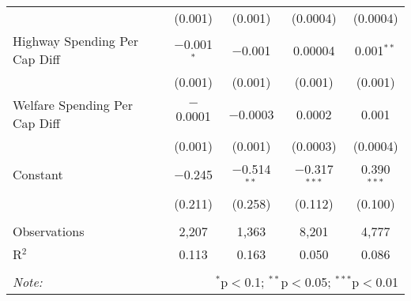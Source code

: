 \begin{table}[!htbp]
\begin{tabular}{@{\extracolsep{5pt}}lcccc}
  & (0.001) & (0.001) & (0.0004) & (0.0004) \\ 
  Highway Spending Per Cap Diff & $-$0.001$^{*}$ & $-$0.001 & 0.00004 & 0.001$^{**}$ \\ 
  & (0.001) & (0.001) & (0.001) & (0.001) \\ 
  Welfare Spending Per Cap Diff & $-$0.0001 & $-$0.0003 & 0.0002 & 0.001 \\ 
  & (0.001) & (0.001) & (0.0003) & (0.0004) \\ 
  Constant & $-$0.245 & $-$0.514$^{**}$ & $-$0.317$^{***}$ & 0.390$^{***}$ \\ 
  & (0.211) & (0.258) & (0.112) & (0.100) \\ 
 \hline \\[-1.8ex] 
Observations & 2,207 & 1,363 & 8,201 & 4,777 \\ 
R$^{2}$ & 0.113 & 0.163 & 0.050 & 0.086 \\ 
\hline 
\hline \\[-1.8ex] 
\textit{Note:}  & \multicolumn{4}{r}{$^{*}$p$<$0.1; $^{**}$p$<$0.05; $^{***}$p$<$0.01} \\ 
\end{tabular} 
\end{table} 
